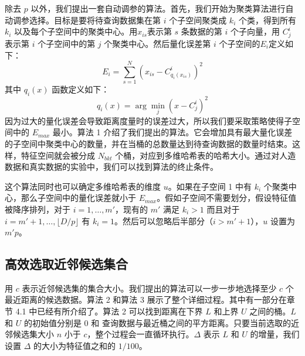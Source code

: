 除去 $p$ 以外，我们提出一套自动调参的算法。首先，我们开始为聚类算法进行自动调参选择。目标是要将待查询数据集在第 $i$ 个子空间聚类成 $k_i$ 个类，得到所有 ${k_i}$ 以及每个子空间中的聚类中心。用$x_{is}$表示第 $s$ 条数据的第 $i$ 个子向量，用 $C_j^i$ 表示第 $i$ 个子空间中的第 $j$ 个聚类中心。然后量化误差第 $i$ 个子空间的$E_i$定义如下：
\begin{equation}
E_i = \sum_{s=1}^N\left( x_{is} - C^i_{q_i(x_{is})}\right)^2
\end{equation}
其中 $q_i(x)$ 函数定义如下：
\begin{equation}
q_i(x) = \arg\min_{j} \left( x - C^i_j\right)^2
\end{equation}
因为过大的量化误差会导致距离度量时的误差过大，所以我们要采取策略使得子空间中的 $E_{max}$ 最小。算法 1 介绍了我们提出的算法。它会增加具有最大量化误差的子空间中聚类中心的数量，并在当桶的总数量达到待查询数据的数量时结束。这样，特征空间就会被分成 $N_{bkt}$ 个桶，对应到多维哈希表的哈希大小。通过对人造数据和真实数据的实验中，我们可以找到算法的终止条件。

这个算法同时也可以确定多维哈希表的维度 $u$。如果在子空间 1 中有 $k_i$ 个聚类中心，那么子空间中的量化误差就小于 $E_{max}$。假如子空间不需要划分，假设特征值被降序排列，对于 $i=1,\ldots,m'$，现有的 $m'$ 满足 $k_i > 1$ 而且对于 $i=m'+1,\ldots,\lfloor D/p\rfloor$ 有 $k_i=1$。然后可以忽略后半部分（$i>m'+1$），$u$ 设置为 $m'p$。
\subsection{高效选取近邻候选集合}
用 $c$ 表示近邻候选集的集合大小。我们提出的算法可以一步一步地选择至少 $c$ 个最近距离的候选数据。算法 2 和算法 3 展示了整个详细过程。其中有一部分在章节 4.1 中已经有所介绍了。算法 2 可以找到距离在下界 $L$ 和上界 $U$ 之间的桶。$L$ 和 $U$ 的初始值分别是 0 和 查询数据与最近桶之间的平方距离。只要当前选取的近邻候选集大小 $n$ 小于 $c$，整个过程会一直循环执行。$\Delta$ 表示 $L$ 和 $U$ 的增量，我们设置 $\Delta$ 的大小为特征值之和的 $1/100$。
